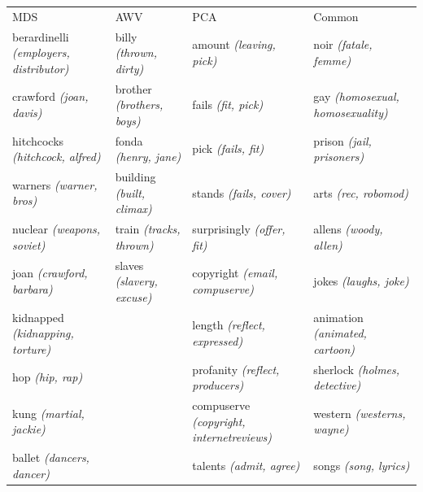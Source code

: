 \begin{landscape}
	\begin{table}[]
		\scriptsize
		\begin{tabular}{llll}
			MDS                                   & AWV                      & PCA                                     & Common                                  \\
			berardinelli \textit{(employers, distributor)} & billy \textit{(thrown, dirty)}    & amount \textit{(leaving, pick)}                  & noir \textit{(fatale, femme)}                    \\
			crawford \textit{(joan, davis)}                & brother \textit{(brothers, boys)} & fails \textit{(fit, pick)}                       & gay \textit{(homosexual, homosexuality)}         \\
			hitchcocks \textit{(hitchcock, alfred)}        & fonda \textit{(henry, jane)}      & pick \textit{(fails, fit)}                       & prison \textit{(jail, prisoners)}                \\
			warners \textit{(warner, bros)}                & building \textit{(built, climax)} & stands \textit{(fails, cover)}                   & arts \textit{(rec, robomod)}                     \\
			nuclear \textit{(weapons, soviet)}             & train \textit{(tracks, thrown)}   & surprisingly \textit{(offer, fit)}               & allens \textit{(woody, allen)}                   \\
			joan \textit{(crawford, barbara)}              & slaves \textit{(slavery, excuse)} & copyright \textit{(email, compuserve)}           & jokes \textit{(laughs, joke)}                    \\
			kidnapped \textit{(kidnapping, torture)}       &                          & length \textit{(reflect, expressed)}             & animation \textit{(animated, cartoon)}           \\
			hop \textit{(hip, rap)}                        &                          & profanity \textit{(reflect, producers)}          & sherlock \textit{(holmes, detective)}            \\
			kung \textit{(martial, jackie)}                &                          & compuserve \textit{(copyright, internetreviews)} & western \textit{(westerns, wayne)}               \\
			ballet \textit{(dancers, dancer)}              &                          & talents \textit{(admit, agree)}                  & songs \textit{(song, lyrics)}                    \\

\end{tabular}
\end{table}
\end{landscape}
